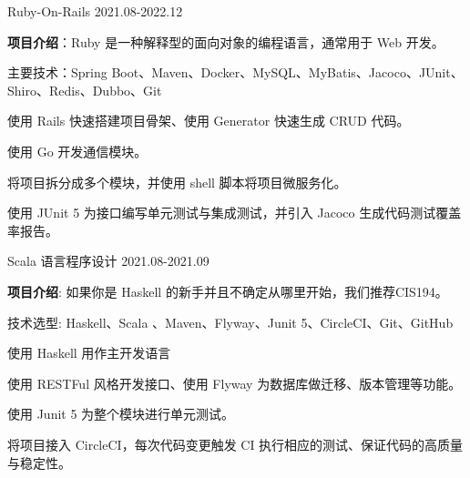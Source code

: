 \begin{cventries}
      \cventryjob
    {} %
    {Ruby-On-Rails} %
    {2021.08-2022.12} %
    {} %
    {
      \begin{cvitems} %
        \item {\textbf{项目介绍}：Ruby 是一种解释型的面向对象的编程语言，通常用于 Web 开发。}
        \item {主要技术：Spring Boot、Maven、Docker、MySQL、MyBatis、Jacoco、JUnit、Shiro、Redis、Dubbo、Git}
        \item {使用 Rails 快速搭建项目骨架、使用 Generator 快速生成 CRUD 代码。}
        \item {使用 Go 开发通信模块。}
        \item {将项目拆分成多个模块，并使用 shell 脚本将项目微服务化。}
        \item {使用 JUnit 5 为接口编写单元测试与集成测试，并引入 Jacoco 生成代码测试覆盖率报告。}
      \end{cvitems}
    }

  \cventryjob
    {} %
    {Scala 语言程序设计} %
    {2021.08-2021.09} %
    {} %
    {
      \begin{cvitems} %
        \item {\textbf{项目介绍}: 如果你是 Haskell 的新手并且不确定从哪里开始，我们推荐CIS194。}
        \item {技术选型: Haskell、Scala 、Maven、Flyway、Junit 5、CircleCI、Git、GitHub}
        \item {使用 Haskell 用作主开发语言}
        \item {使用 RESTFul 风格开发接口、使用 Flyway 为数据库做迁移、版本管理等功能。}
        \item {使用 Junit 5 为整个模块进行单元测试。}
        \item {将项目接入 CircleCI，每次代码变更触发 CI 执行相应的测试、保证代码的高质量与稳定性。}
      \end{cvitems}
    }

\end{cventries}
